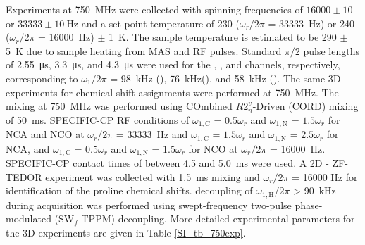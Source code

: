 \documentclass[%
 aip,
 amsmath,amssymb,
 preprint,%
]{revtex4-1}
\begin{document}
Experiments at \SI{750}{\mega\hertz} were collected with spinning frequencies of $16000\pm10$ or $33333\pm\SI{10}{\hertz}$ and a set point temperature of 230 ($\omega_{r}/2\pi$ = \SI{33333}{\hertz}) or 240 ($\omega_{r}/2\pi$ = \SI{16000}{\hertz}) $\pm$ \SI{1}{\kelvin}. The sample temperature is estimated to be 290 $\pm$ \SI{5}{\kelvin} due to sample heating from MAS and RF pulses.\cite{Zhang2019} Standard $\pi/2$ pulse lengths of \SI{2.55}{\micro\second}, \SI{3.3}{\micro\second}, and \SI{4.3}{\micro\second} were used for the , , and  channels, respectively, corresponding to $\omega_1/2\pi$ = \SI{98}{\kilo\hertz} (), \SI{76}{\kilo\hertz}(), and \SI{58}{\kilo\hertz} (). The same 3D experiments for chemical shift assignments were performed at \SI{750}{\mega\hertz}. The - mixing at \SI{750}{\mega\hertz} was performed using COmbined $R2^v_n$-Driven (CORD) mixing of \SI{50}{\milli\second}.\cite{Hou2013} SPECIFIC-CP RF conditions of $\omega_{1,\text{C}}$ = 0.5$\omega_{r}$ and $\omega_{1,\text{N}}$ = $ 1.5\omega_{r}$ for NCA and NCO at $\omega_{r}/2\pi$ = \SI{33333}{\hertz} and $\omega_{1,\text{C}}$ = $1.5\omega_{r}$ and $\omega_{1,\text{N}}$ = $2.5\omega_{r}$ for NCA, and $\omega_{1,\text{C}}$ = $0.5\omega_{r}$ and $\omega_{1,\text{N}}$ = $1.5\omega_{r}$ for NCO at $\omega_{r}/2\pi$ = \SI{16000 }{\hertz}. SPECIFIC-CP contact times of between 4.5 and \SI{5.0}{\milli\second} were used. A 2D - ZF-TEDOR experiment\cite{Jaroniec2002} was collected with \SI{1.5}{\milli\second} mixing and $\omega_{r}/2\pi$ = 16000 Hz for identification of the proline chemical shifts.  decoupling of $\omega_{1,\text{H}}/2\pi$ > \SI{90}{\kilo\hertz} during acquisition was performed using swept-frequency two-pulse phase-modulated (SW$_f$-TPPM) decoupling.\cite{Thakur2006} More detailed experimental parameters for the 3D experiments are given in Table \ref{SI_tb_750exp}.
\end{document}
